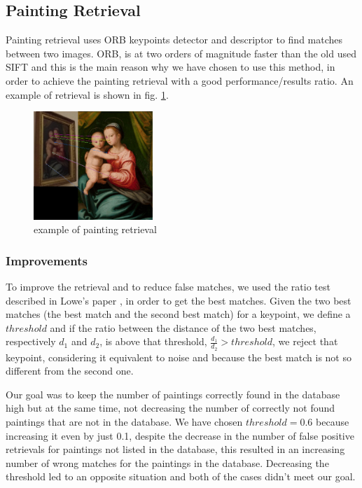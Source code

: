 \subsection{Painting Retrieval}
Painting retrieval uses ORB \cite{orb} keypoints detector and descriptor to find matches between two images. ORB, is at two orders of magnitude faster than the old used SIFT \cite{sift} and this is the main reason why we have chosen to use this method, in order to achieve the painting retrieval with a good performance/results ratio.
An example of retrieval is shown in fig. \ref{fig:retrieval_ex}.
\begin{figure}[h!]
    \centering
    \includegraphics[width=0.4\textwidth]{pictures/painting_retrieval/retrieval}
    \caption{example of painting retrieval}
    \label{fig:retrieval_ex}
\end{figure}

\subsubsection{Improvements}
To improve the retrieval and to reduce false matches, we used the ratio test described in Lowe's paper \cite{sift}, in order to get the best matches. Given the two best matches (the best match and the second best match) for a keypoint, we define a \(threshold\) and if the ratio between the distance of the two best matches, respectively \(d_1\) and \(d_2\), is above that threshold, \(\frac{d_1}{d_2}>threshold\), we reject that keypoint, considering it equivalent to noise and because the best match is not so different from the second one.

Our goal was to keep the number of paintings correctly found in the database high but at the same time, not decreasing the number of correctly not found paintings that are not in the database. We have chosen \(threshold = 0.6\) because increasing it even by just 0.1, despite the decrease in the number of false positive retrievals for paintings not listed in the database, this resulted in an increasing number of wrong matches for the paintings in the database. Decreasing the threshold led to an opposite situation and both of the cases didn't meet our goal.

